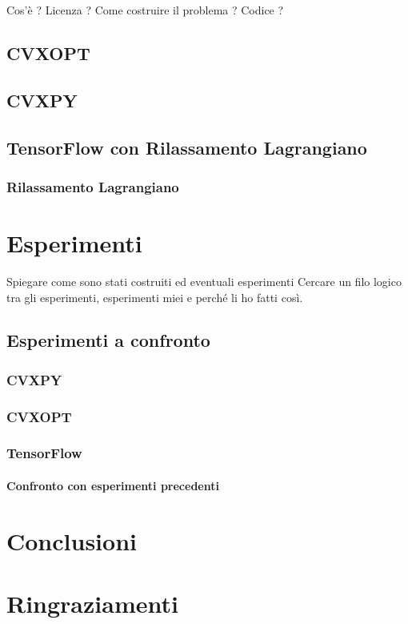 \documentclass[a4paper,12pt]{report}
\begin{document}
Cos'è ? Licenza ? Come costruire il problema ? Codice ? 
\section{CVXOPT}
\section{CVXPY}
\section{TensorFlow con Rilassamento Lagrangiano}
\subsection{Rilassamento Lagrangiano}

%

\chapter{Esperimenti}
\label{Captiolo 3}

Spiegare come sono stati costruiti ed eventuali esperimenti
Cercare un filo logico tra gli esperimenti, esperimenti miei e perché li ho fatti così.
\section{Esperimenti a confronto}
\subsection{CVXPY}
\subsection{CVXOPT}
\subsection{TensorFlow}
\subsubsection{Confronto con esperimenti precedenti}

\chapter{Conclusioni}
\label{Conclusioni}

\chapter*{Ringraziamenti}
\label{Ringraziamenti}

%
%



\end{document}
